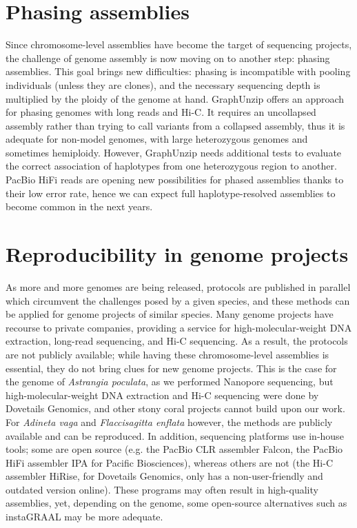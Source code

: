 \section{Phasing assemblies}

Since chromosome-level assemblies have become the target of sequencing projects, the challenge of genome assembly is now moving on to another step: phasing assemblies. This goal brings new difficulties: phasing is incompatible with pooling individuals (unless they are clones), and the necessary sequencing depth is multiplied by the ploidy of the genome at hand. GraphUnzip offers an approach for phasing genomes with long reads and Hi-C. It requires an uncollapsed assembly rather than trying to call variants from a collapsed assembly, thus it is adequate for non-model genomes, with large heterozygous genomes and sometimes hemiploidy. However, GraphUnzip needs additional tests to evaluate the correct association of haplotypes from one heterozygous region to another. PacBio HiFi reads are opening new possibilities for phased assemblies thanks to their low error rate, hence we can expect full haplotype-resolved assemblies to become common in the next years. \\

\section{Reproducibility in genome projects}

As more and more genomes are being released, protocols are published in parallel which circumvent the challenges posed by a given species, and these methods can be applied for genome projects of similar species. Many genome projects have recourse to private companies, providing a service for high-molecular-weight DNA extraction, long-read sequencing, and Hi-C sequencing. As a result, the protocols are not publicly available; while having these chromosome-level assemblies is essential, they do not bring clues for new genome projects. This is the case for the genome of \textit{Astrangia poculata}, as we performed Nanopore sequencing, but high-molecular-weight DNA extraction and Hi-C sequencing were done by Dovetails Genomics, and other stony coral projects cannot build upon our work. For \textit{Adineta vaga} and \textit{Flaccisagitta enflata} however, the methods are publicly available and can be reproduced. In addition, sequencing platforms use in-house tools; some are open source (e.g. the PacBio CLR assembler Falcon, the PacBio HiFi assembler IPA for Pacific Biosciences), whereas others are not (the Hi-C assembler HiRise, for Dovetails Genomics, only has a non-user-friendly and outdated version online). These programs may often result in high-quality assemblies, yet, depending on the genome, some open-source alternatives such as instaGRAAL may be more adequate. \\

